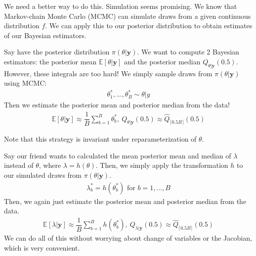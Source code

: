 \documentclass[12pt]{article}
\newcommand{\E}{\mathbb{E}}
\begin{document}
\medskip

\noindent We need a better way to do this. Simulation seems promising. We know that Markov-chain Monte Carlo (MCMC) can simulate draws from a given continuous distribution $f$. We can apply this to our posterior distribution to obtain estimates of our Bayesian estimators.

\medskip

\begin{tcolorbox}[breakable, title= \textbf{Example}: Bayesian simulation]
    Say have the posterior distribution $\pi(\theta|\textbf{y})$. We want to compute 2 Bayesian estimators: the posterior mean $\E[\theta|\textbf{y}]$ and the posterior median $Q_{\theta|\textbf{y}}(0.5)$. However, these integrals are too hard! We simply sample draws from $\pi(\theta|\textbf{y})$ using MCMC:
    \begin{align*}
        \theta_1^*, \dots,\theta_B^* \sim \theta|y
    \end{align*}
    Then we estimate the posterior mean and posterior median from the data!
    \begin{align*}
        \E[\theta|\textbf{y}] \approx \dfrac{1}{B}\sum_{b=1}^{B}\theta_b^*, \ Q_{\theta|\textbf{y}}(0.5) \approx \hat Q_{\lceil 0.5B\rceil}(0.5)
    \end{align*}
\end{tcolorbox}

\medskip

\noindent Note that this strategy is invariant under reparameterization of $\theta$.

\medskip

\begin{tcolorbox}[breakable, title= \textbf{Example}: Bayesian simulation using reparameterization]
    Say our friend wants to calculated the mean posterior mean and median of $\lambda$ instead of $\theta$, where $\lambda = h(\theta)$. Then, we simply apply the transformation $h$ to our simulated draws from $\pi(\theta|\textbf{y})$.
    \begin{align*}
        \lambda_b^* = h(\theta_b^*) \text{ for }b=1,\dots, B
    \end{align*}
    Then, we again just estimate the posterior mean and posterior median from the data.
    \begin{align*}
        \E[\lambda|\textbf{y}] \approx \dfrac{1}{B}\sum_{b=1}^{B}h(\theta_b^*), \ Q_{\lambda|\textbf{y}}(0.5) \approx \hat Q_{\lceil 0.5B\rceil}(0.5)
    \end{align*}
    We can do all of this without worrying about change of variables or the Jacobian, which is very convenient.
    
\end{tcolorbox}
\end{document}

